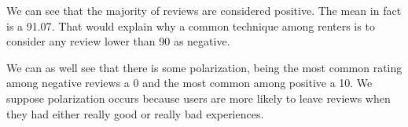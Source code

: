 


We can see that the majority of reviews are considered positive. The mean in fact is 
a 91.07. That would explain why a common technique among renters is to consider 
any review lower than 90 as negative. 

We can as well see that there is some polarization, being the most common rating among 
negative reviews a 0 and the most common among positive a 10. We suppose polarization occurs
because users are more likely to leave reviews when they had either really good or 
really bad experiences.


